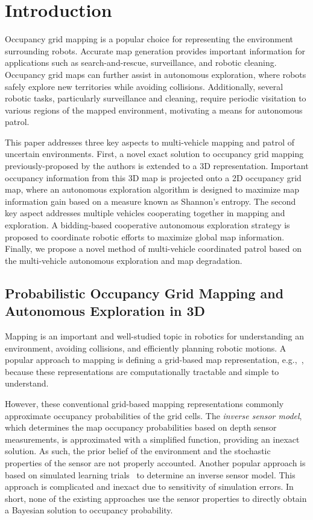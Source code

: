 \documentclass[smallextended]{svjour3}       %
\begin{document}
\section{Introduction}
\label{intro}

Occupancy grid mapping is a popular choice for representing the environment surrounding robots. Accurate map generation provides important information for applications such as search-and-rescue, surveillance, and robotic cleaning. Occupancy grid maps can further assist in autonomous exploration, where robots safely explore new territories while avoiding collisions. Additionally, several robotic tasks, particularly surveillance and cleaning, require periodic visitation to various regions of the mapped environment, motivating a means for autonomous patrol.

This paper addresses three key aspects to multi-vehicle mapping and patrol of uncertain environments. First, a novel exact solution to occupancy grid mapping previously-proposed by the authors is extended to a 3D representation. Important occupancy information from this 3D map is projected onto a 2D occupancy grid map, where an autonomous exploration algorithm is designed to maximize map information gain based on a measure known as Shannon's entropy. The second key aspect addresses multiple vehicles cooperating together in mapping and exploration. A bidding-based cooperative autonomous exploration strategy is proposed to coordinate robotic efforts to maximize global map information. Finally, we propose a novel method of multi-vehicle coordinated patrol based on the multi-vehicle autonomous exploration and map degradation.

\subsection{Probabilistic Occupancy Grid Mapping and Autonomous Exploration in 3D}

Mapping is an important and well-studied topic in robotics for understanding an environment, avoiding collisions, and efficiently planning robotic motions.
A popular approach to mapping is defining a grid-based map representation, e.g.,~\cite{WolSuk05,MeyBeiBur12,TanThoWolBus14}, because these representations are computationally tractable and simple to understand.

However, these conventional grid-based mapping representations commonly approximate occupancy probabilities of the grid cells. The \emph{inverse sensor model}, which determines the map occupancy probabilities based on depth sensor measurements, is approximated with a simplified function, providing an inexact solution. As such, the prior belief of the environment and the stochastic properties of the sensor are not properly accounted. Another popular approach is based on simulated learning trials~\cite{Thr01,ThrBurFox05,SouMaiGon12} to determine an inverse sensor model. This approach is complicated and inexact due to sensitivity of simulation errors. In short, none of the existing approaches use the sensor properties to directly obtain a Bayesian solution to occupancy probability.
\end{document}
